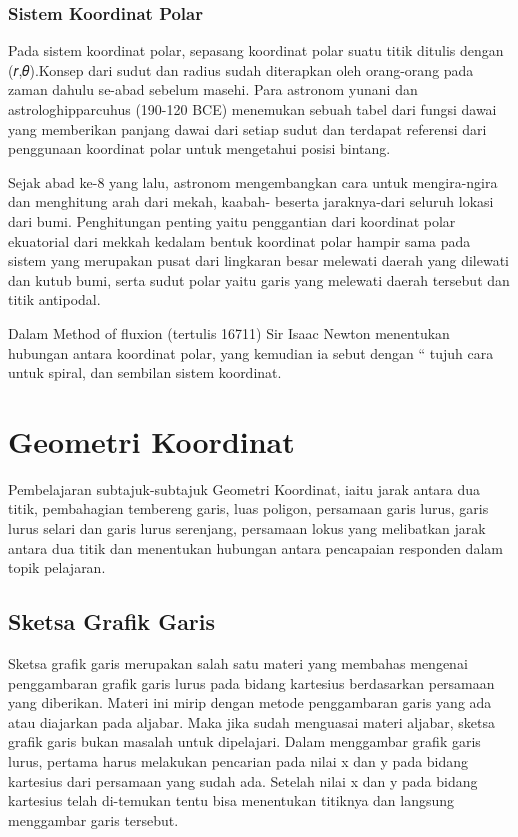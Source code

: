 \subsubsection{Sistem Koordinat Polar}
Pada sistem koordinat polar, sepasang koordinat polar suatu titik ditulis dengan (𝑟,𝜃)\cite{mufidah2015solusi}.Konsep dari sudut dan radius sudah diterapkan oleh orang-orang pada zaman dahulu se-abad sebelum masehi. Para astronom yunani dan astrologhipparcuhus (190-120 BCE) menemukan sebuah tabel dari fungsi dawai yang memberikan panjang dawai dari setiap sudut dan terdapat referensi dari penggunaan koordinat polar untuk mengetahui posisi bintang.

Sejak abad ke-8 yang lalu, astronom mengembangkan cara untuk mengira-ngira dan menghitung arah dari mekah, kaabah- beserta jaraknya-dari seluruh lokasi dari bumi. Penghitungan penting yaitu penggantian dari koordinat polar ekuatorial dari mekkah kedalam bentuk koordinat polar hampir sama pada sistem yang merupakan pusat dari lingkaran besar melewati daerah yang dilewati dan kutub bumi, serta sudut polar yaitu garis yang melewati daerah tersebut dan titik antipodal.

Dalam Method of fluxion (tertulis 16711) Sir Isaac Newton menentukan hubungan antara koordinat polar, yang kemudian ia sebut dengan “ tujuh cara untuk spiral, dan sembilan sistem koordinat. 

\section{Geometri Koordinat}
 Pembelajaran subtajuk-subtajuk Geometri Koordinat, iaitu jarak antara dua titik, pembahagian tembereng garis, luas poligon, persamaan garis lurus, garis lurus selari dan garis lurus serenjang, persamaan lokus yang melibatkan jarak antara dua titik dan menentukan hubungan antara pencapaian responden dalam topik pelajaran\cite{shong2013analisis}.
 
 \subsection{Sketsa Grafik Garis}
 Sketsa grafik garis merupakan salah satu materi yang membahas mengenai penggambaran grafik garis lurus pada bidang kartesius berdasarkan persamaan yang diberikan. Materi ini mirip dengan metode penggambaran garis yang ada atau diajarkan pada aljabar. Maka jika sudah menguasai materi aljabar, sketsa grafik garis bukan masalah untuk dipelajari. Dalam menggambar grafik garis lurus, pertama harus melakukan pencarian pada nilai x dan y pada bidang kartesius dari persamaan yang sudah ada. Setelah nilai x dan y pada bidang kartesius telah di-temukan tentu bisa menentukan titiknya dan langsung menggambar garis tersebut.
 
